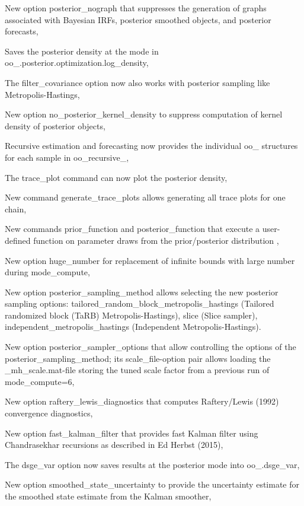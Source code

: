 \documentclass[10pt,math=newtx,citestyle=gb7714-2015,bibstyle=gb7714-2015]{elegantbook}
\begin{document}
\begin{itemize}
		
		New option posterior\_nograph that suppresses the generation of graphs associated with Bayesian IRFs, posterior smoothed objects, and posterior forecasts,
		
		
		Saves the posterior density at the mode in oo\_.posterior.optimization.log\_density,
		
		
		The filter\_covariance option now also works with posterior sampling like Metropolis-Hastings,
		
		
		New option no\_posterior\_kernel\_density to suppress computation of kernel density of posterior objects,
		
		
		Recursive estimation and forecasting now provides the individual
		oo\_ structures for each sample in oo\_recursive\_,
		
		
		The trace\_plot command can now plot the posterior density,
		
		
		New command generate\_trace\_plots allows generating all trace plots for one chain,
		
		
		New commands prior\_function and posterior\_function that execute a user-defined function on parameter draws from the prior/posterior distribution ,
		
		
		New option huge\_number for replacement of infinite bounds with large number during mode\_compute,
		
		
		New option posterior\_sampling\_method allows selecting the new posterior sampling options: tailored\_random\_block\_metropolis\_hastings (Tailored randomized block (TaRB) Metropolis-Hastings), slice (Slice sampler), independent\_metropolis\_hastings (Independent Metropolis-Hastings).
		
		
		New option posterior\_sampler\_options that allow controlling the options of the posterior\_sampling\_method; its scale\_file-option pair allows loading the \_mh\_scale.mat-file storing the tuned scale factor from a previous run of mode\_compute=6,
		
		
		New option raftery\_lewis\_diagnostics that computes Raftery/Lewis (1992) convergence diagnostics,
		
		
		New option fast\_kalman\_filter that provides fast Kalman filter using Chandrasekhar recursions as described in Ed Herbst (2015),
		
		
		The dsge\_var option now saves results at the posterior mode into oo\_.dsge\_var,
		
		
		New option smoothed\_state\_uncertainty to provide the uncertainty estimate for the smoothed state estimate from the Kalman smoother,
		

\end{itemize}
\end{document}
